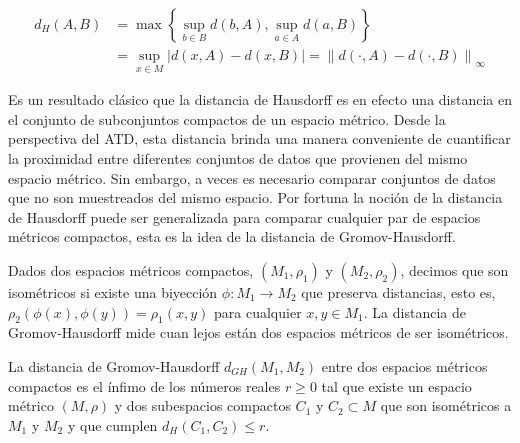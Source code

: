 \begin{align*}
    d_{H}\left(A, B\right) & = \max\left\{\sup_{b\in B}d\left(b, A\right),
    \sup_{a\in A}d\left(a, B\right)\right\} \\
    & = \sup_{x\in M}\left|d\left(x, A\right) - d\left(x, B\right)\right| =
    \left\|d\left(\cdot, A\right) - d\left(\cdot, B\right)\right\|_{\infty}
\end{align*}

Es un resultado cl\'asico que la distancia de Hausdorff es en efecto una distancia en el conjunto de
subconjuntos compactos de un espacio m\'etrico. Desde la perspectiva del ATD, esta distancia
brinda una manera conveniente de cuantificar la proximidad entre diferentes conjuntos de datos que
provienen del mismo espacio m\'etrico. Sin embargo, a veces es necesario comparar conjuntos de datos que
no son muestreados del mismo espacio. Por fortuna la noci\'on de la distancia de Hausdorff puede ser
generalizada para comparar cualquier par de espacios m\'etricos compactos, esta es la idea de la distancia
de Gromov-Hausdorff.

Dados dos espacios m\'etricos compactos, $\left(M_{1}, \rho_{1}\right)$ y $\left(M_{2}, \rho_{2}\right)$,
decimos que son isom\'etricos si existe una biyecci\'on $\phi: M_{1}\rightarrow M_{2}$ que preserva
distancias, esto es, $\rho_{2}\left(\phi\left(x\right), \phi\left(y\right)\right) =
\rho_{1}\left(x, y\right)$ para cualquier $x, y \in M_{1}$. La distancia de Gromov-Hausdorff mide cuan lejos
est\'an dos espacios m\'etricos de ser isom\'etricos.

\begin{definicion}
    La distancia de Gromov-Hausdorff $d_{GH}\left(M_{1}, M_{2}\right)$ entre dos espacios m\'etricos
    compactos es el \'infimo de los n\'umeros reales $r \geq 0$ tal que existe un espacio m\'etrico
    $\left(M, \rho\right)$ y dos subespacios compactos $C_{1}$ y $C_{2} \subset M$ que son isom\'etricos
    a $M_{1}$ y $M_{2}$ y que cumplen $d_{H}\left(C_{1}, C_{2}\right) \leq r$.
\end{definicion}

